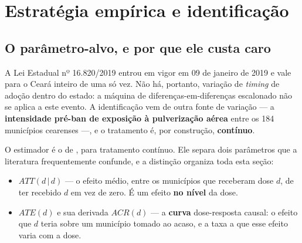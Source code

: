 %
%
%

\section{Estratégia empírica e identificação}
\label{sec:identificacao}

\subsection{O parâmetro-alvo, e por que ele custa caro}
\label{sub:estimando}

A Lei Estadual nº 16.820/2019 entrou em vigor em 09 de janeiro de 2019 e vale
para o Ceará inteiro de uma só vez. Não há, portanto, variação de \emph{timing}
de adoção dentro do estado: a máquina de diferenças-em-diferenças escalonado
\citep{callaway2021multiple,goodmanbacon2021,dechaisemartin2020} não se aplica a
este evento. A identificação vem de outra fonte de variação --- a
\textbf{intensidade pré-ban de exposição à pulverização aérea} entre os 184
municípios cearenses ---, e o tratamento é, por construção, \textbf{contínuo}.

O estimador é o de \citet{callaway2024continuous}, para tratamento contínuo.
Ele separa dois parâmetros que a literatura frequentemente confunde, e a
distinção organiza toda esta seção:

\begin{itemize}
  \item $ATT(d\,|\,d)$ --- o efeito médio, entre os municípios que receberam
    dose $d$, de ter recebido $d$ em vez de zero. É um efeito \textbf{no nível}
    da dose.
  \item $ATE(d)$ e sua derivada $ACR(d)$ --- a \textbf{curva} dose-resposta
    causal: o efeito que $d$ teria sobre um município tomado ao acaso, e a taxa
    a que esse efeito varia com a dose.
\end{itemize}

